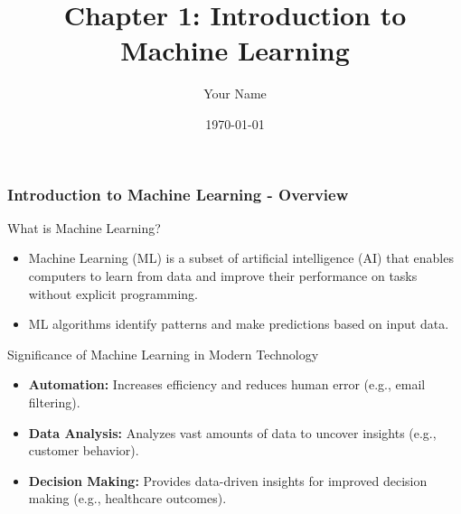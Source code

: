 \documentclass{beamer}
\title{Chapter 1: Introduction to Machine Learning}
\author{Your Name}
\institute{Your Institution}
\date{\today}
\begin{document}
\frame{\titlepage}

\begin{frame}[fragile]
    \titlepage
\end{frame}

\begin{frame}[fragile]
    \frametitle{Introduction to Machine Learning - Overview}
    \begin{block}{What is Machine Learning?}
        \begin{itemize}
            \item Machine Learning (ML) is a subset of artificial intelligence (AI) that enables computers to learn from data and improve their performance on tasks without explicit programming.
            \item ML algorithms identify patterns and make predictions based on input data.
        \end{itemize}
    \end{block}
    
    \begin{block}{Significance of Machine Learning in Modern Technology}
        \begin{itemize}
            \item \textbf{Automation:} Increases efficiency and reduces human error (e.g., email filtering).
            \item \textbf{Data Analysis:} Analyzes vast amounts of data to uncover insights (e.g., customer behavior).
            \item \textbf{Decision Making:} Provides data-driven insights for improved decision making (e.g., healthcare outcomes).
        \end{itemize}
    \end{block}
\end{frame}
\end{document}
